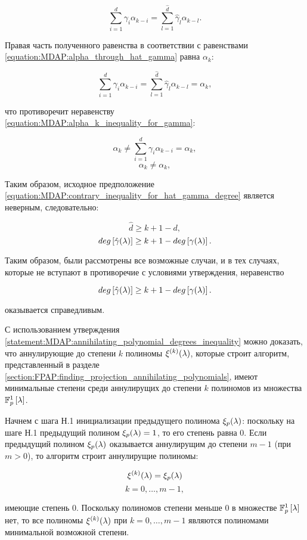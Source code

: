 \begin{statement}
\begin{enumerate}
\begin{enumerate}
						$$ \sum_{i=1}^{d} \gamma_i \alpha_{k-i} = \sum_{l=1}^{\hat d} \hat\gamma_l \alpha_{k-l}. $$

					Правая часть полученного равенства в соответствии с равенствами \eqref{equation:MDAP:alpha_through_hat_gamma} равна $\alpha_k$:

						$$ \sum_{i=1}^{d} \gamma_i \alpha_{k-i} = \sum_{l=1}^{\hat d} \hat\gamma_l \alpha_{k-l} = \alpha_k, $$

					что противоречит неравенству \eqref{equation:MDAP:alpha_k_inequality_for_gamma}:

						$$ \alpha_k \neq \sum_{i=1}^{d} \gamma_i \alpha_{k-i} = \alpha_k, $$
						$$ \alpha_k \neq \alpha_k, $$

					Таким образом, исходное предположение \eqref{equation:MDAP:contrary_inequality_for_hat_gamma_degree} является неверным,
					следовательно:

						$$ \hat d \ge k + 1 - d, $$
						$$ deg \left [ \hat\gamma (\lambda) \right ] \ge k + 1 - deg \left [ \gamma (\lambda) \right ]. $$
			\end{enumerate}
	\end{enumerate}

	Таким образом, были рассмотрены все возможные случаи, и в тех случаях, которые не вступают в противоречие с условиями утверждения, неравенство

		$$ deg \left [ \hat\gamma (\lambda) \right ] \ge k + 1 - deg \left [ \gamma (\lambda) \right ]. $$

	оказывается справедливым.
\end{statement}

С использованием утверждения \ref{statement:MDAP:annihilating_polynomial_degrees_inequality} можно доказать, что аннулирующие до степени
$k$ полиномы $\xi^{(k)} (\lambda)$, которые строит алгоритм, представленный в разделе
\ref{section:FPAP:finding_projection_annihilating_polynomials}, имеют минимальные степени среди аннулирущих до степени $k$ полиномов из
множества $\mathbb{F}_p^1 \left [ \lambda \right ]$.

Начнем с шага Н.1 инициализации предыдущего полинома $\xi_p (\lambda)$: поскольку на шаге Н.1 предыдущий полином $\xi_p (\lambda) = 1$,
то его степень равна 0. Если предыдущий полином $\xi_p (\lambda)$ оказывается аннулирущим до степени $m-1$ (при $m > 0$), то алгоритм
строит аннулирущие полиномы:

	$$ \xi^{(k)} (\lambda) = \xi_p (\lambda) $$
	$$ k=0,\dots,m-1, $$

имеющие степень 0. Поскольку полиномов степени меньше 0 в множестве $\mathbb{F}_p^1 \left [ \lambda \right ]$ нет, то все полиномы $\xi^{(k)} (\lambda)$
при $k=0,\dots,m-1$ являются полиномами минимальной возможной степени.

